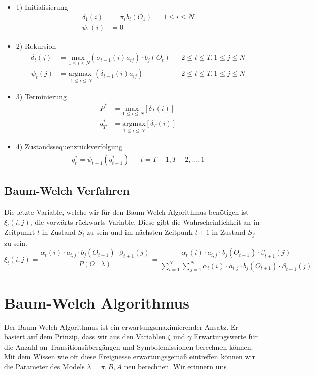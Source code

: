 \begin{itemize}
    \item 1) Initialisierung
    \begin{align*}
        \delta_1(i)  & = \pi_i b_i(O_1) && 1 \leq i \leq N \\
        \psi_1(i) & = 0
    \end{align*}
    \item 2) Rekursion
    \begin{align*}
        \delta_t(j) & = \underset{1 \leq i \leq N}{\text{max }} (\sigma_{t-1}(i)a_{ij}) \cdot b_j(O_t) && 2 \leq t \leq T, 1 \leq j \leq N \\
        \psi_t(j) & = \underset{1 \leq i \leq N}{\text{argmax }} (\delta_{t-1}(i)a_{ij}) && 2 \leq t \leq T, 1 \leq j \leq N
    \end{align*}
    \item 3) Terminierung
    \begin{align*}
        P^* & = \underset{1 \leq i \leq N}{\text{max }} [\delta_T(i)] \\
        q_T^* & = \underset{1 \leq i \leq N}{\text{argmax}} [\delta_T(i)]
    \end{align*}
    \item 4) Zustandssequenzrückverfolgung
    \begin{align*}
        q^*_t = \psi_{t+1}(q^*_{t+1}) && t = T - 1, T - 2, \dots, 1
    \end{align*}
\end{itemize}


\subsection*{Baum-Welch Verfahren}
Die letzte Variable, welche wir für den Baum-Welch Algorithmus benötigen ist $\xi_t(i, j)$, die vorwärts-rückwarts-Variable. Diese gibt die Wahrscheinlichkeit an in Zeitpunkt $t$ in Zustand $S_i$ zu sein und im nächsten Zeitpunk $t+1$ in Zustand $S_j$ zu sein.
\begin{equation}
\xi_t(i, j)
= \frac{\alpha_t(i) \cdot a_{i,j} \cdot b_j(O_{t+1}) \cdot \beta_{t+1}(j)}{P(O \mid \lambda)}
= \frac{\alpha_t(i) \cdot a_{i,j} \cdot b_j(O_{t+1}) \cdot \beta_{t+1}(j)}
        {\sum_{i=1}^{N} \sum_{j=1}^{N} \alpha_t(i) \cdot a_{i,j} \cdot b_j(O_{t+1}) \cdot \beta_{t+1}(j)}
\end{equation}


\section{Baum-Welch Algorithmus}
Der Baum Welch Algorithmus ist ein erwartungsmaximierender Ansatz. Er basiert auf dem Prinzip, dass wir aus den Variablen $\xi$ und $\gamma$
Erwartungswerte für die Anzahl an Transitionsübergängen und Symbolemissionen berechnen können. Mit dem Wissen wie oft diese Ereignesse erwartungsgemäß eintreffen können wir die Parameter des Models $\lambda = \pi, B, A$ neu berechnen. Wir erinnern uns

